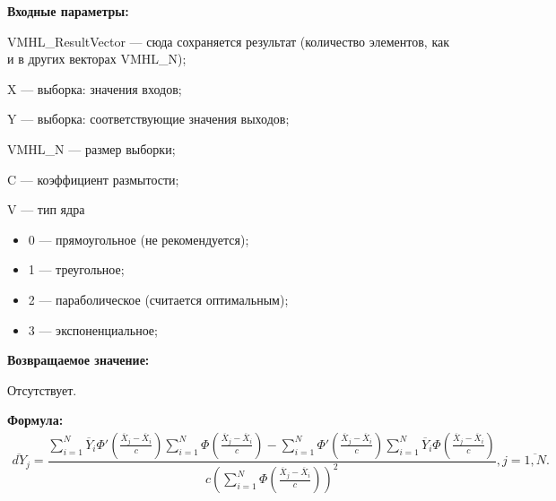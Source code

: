 \textbf{Входные параметры:} 
 
VMHL\_ResultVector --- сюда сохраняется результат (количество элементов, как и в других векторах VMHL\_N);
 
X --- выборка: значения входов;
 
Y --- выборка: соответствующие значения выходов;
 
VMHL\_N --- размер выборки;
 
C --- коэффициент размытости;
 
V --- тип ядра
 
 \begin{itemize}
 \item  0 --- прямоугольное (не рекомендуется);
 \item  1 --- треугольное;
 \item  2 --- параболическое (считается оптимальным);
 \item  3 --- экспоненциальное;
 \end{itemize}

\textbf{Возвращаемое значение:}
 
Отсутствует.

\textbf{Формула:}
\begin{eqnarray*}
\overline{dY}_j =\dfrac{\sum_{i=1}^{N}\overline{Y}_i{\Phi}'\left( \frac{\overline{X}_j-\overline{X}_i}{c}\right) \sum_{i=1}^{N}\Phi\left( \frac{\overline{X}_j-\overline{X}_i}{c}\right)-\sum_{i=1}^{N}{\Phi}'\left( \frac{\overline{X}_j-\overline{X}_i}{c}\right) \sum_{i=1}^{N}\overline{Y}_i\Phi\left( \frac{\overline{X}_j-\overline{X}_i}{c}\right)}{c\left( \sum_{i=1}^{N}\Phi\left( \frac{\overline{X}_j-\overline{X}_i}{c}\right)\right)^2 }, j=\overline{1,N}.
\end{eqnarray*}